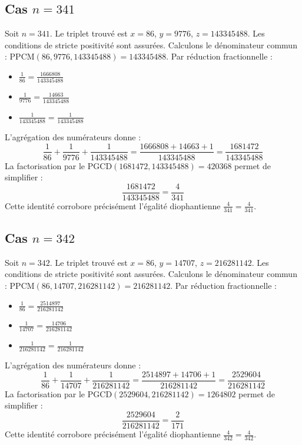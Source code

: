 \documentclass[11pt,a4paper]{article}
\begin{document}
\subsection{Cas $n = 341$}
Soit $n = 341$. Le triplet trouvé est $x = 86$, $y = 9776$, $z = 143345488$.
Les conditions de stricte positivité sont assurées.
Calculons le dénominateur commun : $\text{PPCM}(86, 9776, 143345488) = 143345488$.
Par réduction fractionnelle :
\begin{itemize}
    \item $\frac{1}{86} = \frac{1666808}{143345488}$
    \item $\frac{1}{9776} = \frac{14663}{143345488}$
    \item $\frac{1}{143345488} = \frac{1}{143345488}$
\end{itemize}
L'agrégation des numérateurs donne :
$$ \frac{1}{86} + \frac{1}{9776} + \frac{1}{143345488} = \frac{1666808 + 14663 + 1}{143345488} = \frac{1681472}{143345488} $$
La factorisation par le $\text{PGCD}(1681472, 143345488) = 420368$ permet de simplifier :
$$ \frac{1681472}{143345488} = \frac{4}{341} $$
Cette identité corrobore précisément l'égalité diophantienne $\frac{4}{341} = \frac{4}{341}$.

\subsection{Cas $n = 342$}
Soit $n = 342$. Le triplet trouvé est $x = 86$, $y = 14707$, $z = 216281142$.
Les conditions de stricte positivité sont assurées.
Calculons le dénominateur commun : $\text{PPCM}(86, 14707, 216281142) = 216281142$.
Par réduction fractionnelle :
\begin{itemize}
    \item $\frac{1}{86} = \frac{2514897}{216281142}$
    \item $\frac{1}{14707} = \frac{14706}{216281142}$
    \item $\frac{1}{216281142} = \frac{1}{216281142}$
\end{itemize}
L'agrégation des numérateurs donne :
$$ \frac{1}{86} + \frac{1}{14707} + \frac{1}{216281142} = \frac{2514897 + 14706 + 1}{216281142} = \frac{2529604}{216281142} $$
La factorisation par le $\text{PGCD}(2529604, 216281142) = 1264802$ permet de simplifier :
$$ \frac{2529604}{216281142} = \frac{2}{171} $$
Cette identité corrobore précisément l'égalité diophantienne $\frac{4}{342} = \frac{4}{342}$.
\end{document}
